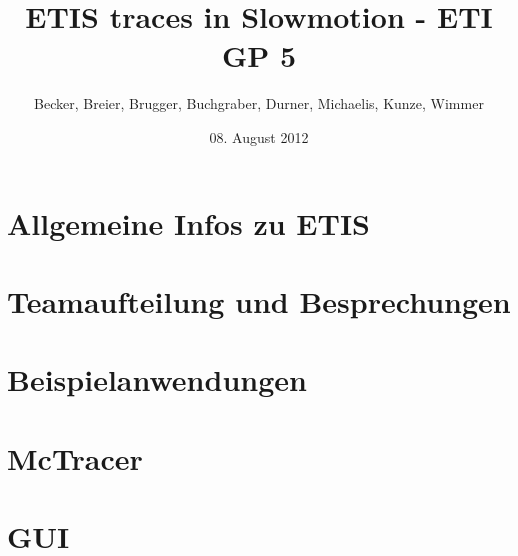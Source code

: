 \documentclass[10pt]{beamer}
\title[ETIS - ETI GP 5 - SS 2012]{ETIS traces in Slowmotion - ETI GP 5}
\author[Becker, Breier, Brugger, Buchgraber, Durner, Michaelis, Kunze, Wimmer]{\small{Becker, Breier, Brugger, Buchgraber, Durner, Michaelis, Kunze, Wimmer}}
\institute[TUM]{Technische Universität München}
\date[08.08.12]{08. August 2012}
\begin{document}
\begin{frame}
\titlepage
\end{frame}

\begin{frame}
\tableofcontents[hideallsubsections]
\end{frame}


\section{Allgemeine Infos zu ETIS} 
\section{Teamaufteilung und Besprechungen} 
\section{Beispielanwendungen} 
\section{McTracer} 
\section{GUI} 
\begin{frame}
\titlepage
\end{frame}
\end{document}
